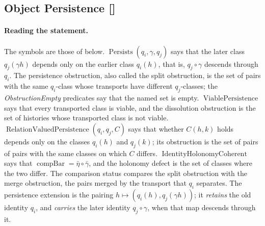 \subsection{Object Persistence [\texorpdfstring{}{F19}]}\label{sec:status-records-coherence:object-persistence}

\paragraph{Reading the statement.} The symbols are those of  below.
\(\operatorname{Persists}(q_i,\gamma,q_j)\) says that the later class
\(q_j(\gamma h)\) depends only on the earlier class \(q_i(h)\), that
is, \(q_j\circ\gamma\) descends through \(q_i\). The persistence
obstruction, also called the split obstruction, is the set of pairs
with the same \(q_i\)-class whose transports have different
\(q_j\)-classes; the \emph{ObstructionEmpty} predicates say that the
named set is empty. \(\operatorname{ViablePersistence}\) says that every
transported class is viable, and the dissolution obstruction is the set
of histories whose transported class is not viable.
\(\operatorname{RelationValuedPersistence}(q_i,q_j,C)\) says that
whether \(C(h,k)\) holds depends only on the classes \(q_i(h)\) and
\(q_j(k)\); its obstruction is the set of pairs of pairs with the same
classes on which \(C\) differs.
\(\operatorname{IdentityHolonomyCoherent}\) says that
\(\operatorname{compBar}=\bar\eta\circ\bar\gamma\), and the holonomy
defect is the set of classes where the two differ. The comparison
status compares the split obstruction with the merge obstruction, the
pairs merged by the transport that \(q_i\) separates.  The persistence
extension is the pairing \(h\mapsto(q_i(h),q_j(\gamma h))\); it
\emph{retains} the old identity \(q_i\), and \emph{carries} the later
identity \(q_j\circ\gamma\), when that map descends through it.

